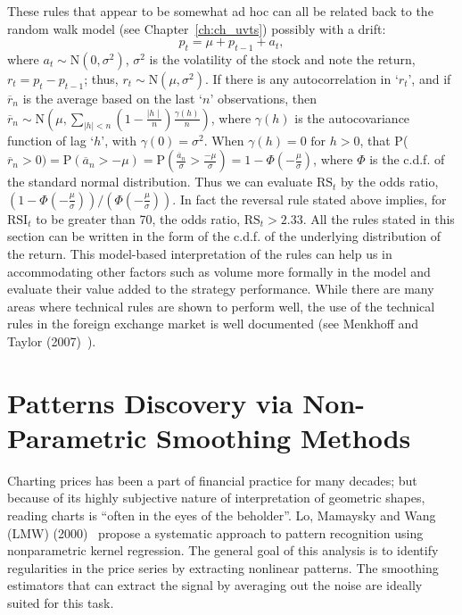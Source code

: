 These rules that appear to be somewhat ad hoc can all be related back to the random walk model (see Chapter~\ref{ch:ch_uvts}) possibly with a drift:
	\begin{equation} \label{eqn:anotherpt}
	p_t = \mu + p_{t-1} + a_t,
	\end{equation}
where $a_t \sim \text{N}(0,\sigma^2)$, $\sigma^2$ is the volatility of the stock and note the return, $r_t= p_t - p_{t-1}$; thus, $r_t \sim \text{N}(\mu,\sigma^2)$. If there is any autocorrelation in `$r_t$', and if $\overline{r}_n$ is the average based on the last `$n$' observations, then $\overline{r}_n \sim \text{N}\left(\mu,\sum_{\mid h \mid < n}\left(1-\frac{\mid h \mid}{n}\right)\frac{\gamma(h)}{n}\right)$, where $\gamma(h)$ is the autocovariance function of lag `$h$', with $\gamma(0)=\sigma^2$. When $\gamma(h)=0 \text{ for } h > 0$, that P($\overline{r}_n > 0)= \text{P}(\overline{a}_n > -\mu)= \text{P}\left( \frac{\overline{a}_n}{\sigma} > \frac{-\mu}{\sigma} \right)= 1 - \Phi\left( -\frac{\mu}{\sigma} \right)$, where $\Phi$ is the c.d.f. of the standard normal distribution. Thus we can evaluate $\text{RS}_t$ by the odds ratio, $(1 - \Phi(-\frac{\mu}{\sigma}))/(\Phi(-\frac{\mu}{\sigma}))$. In fact the reversal rule stated above implies, for $\text{RSI}_t$ to be greater than 70, the odds ratio, $\text{RS}_t > 2.33$. All the rules stated in this section can be written in the form of the c.d.f. of the underlying distribution of the return. This model-based interpretation of the rules can help us in accommodating other factors such as volume more formally in the model and evaluate their value added to the strategy performance. While there are many areas where technical rules are shown to perform well, the use of the technical rules in the foreign exchange market is well documented (see Menkhoff and Taylor (2007)~\cite{MalTay}).



\section{Patterns Discovery via Non-Parametric Smoothing Methods}


Charting prices has been a part of financial practice for many decades; but because of its highly subjective nature of interpretation of geometric shapes, reading charts is ``often in the eyes of the beholder''. Lo, Mamaysky and Wang (LMW) (2000)~\cite{LoMWang} propose a systematic approach to pattern recognition using nonparametric kernel regression. The general goal of this analysis is to identify regularities in the price series by extracting nonlinear patterns. The smoothing estimators that can extract the signal by averaging out the noise are ideally suited for this task.	


